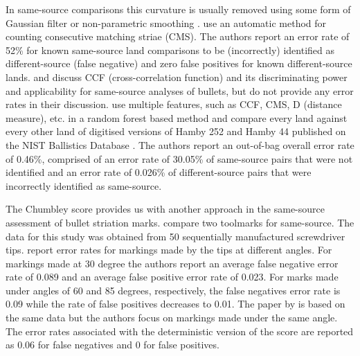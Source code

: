\documentclass[12pt]{article}
\begin{document}
In same-source comparisons this curvature is usually removed using some
form of Gaussian filter \citep{ma2004} or non-parametric smoothing
\citep{aoas}. \citet{chu2013} use an automatic method for counting
consecutive matching striae (CMS). The authors report an error rate of
52\% for known same-source land comparisons to be (incorrectly)
identified as different-source (false negative) and zero false positives
for known different-source lands. \citet{ma2004} and
\citet{vorburger2011} discuss CCF (cross-correlation function) and its
discriminating power and applicability for same-source analyses of
bullets, but do not provide any error rates in their discussion.
\citet{aoas} use multiple features, such as CCF, CMS, D (distance
measure), etc. in a random forest based method and compare every land
against every other land of digitised versions of Hamby 252 and Hamby 44
\citep{hamby} published on the NIST Ballistics Database \citep{nist}.
The authors report an out-of-bag overall error rate of 0.46\%, comprised
of an error rate of 30.05\% of same-source pairs that were not
identified and an error rate of 0.026\% of different-source pairs that
were incorrectly identified as same-source.

The Chumbley score provides us with another approach in the same-source
assessment of bullet striation marks. \citet{chumbley} compare two
toolmarks for same-source. The data for this study was obtained from 50
sequentially manufactured screwdriver tips. \citet{chumbley} report
error rates for markings made by the tips at different angles. For
markings made at 30 degree the authors report an average false negative
error rate of 0.089 and an average false positive error rate of 0.023.
For marks made under angles of 60 and 85 degrees, respectively, the
false negatives error rate is 0.09 while the rate of false positives
decreases to 0.01. The paper by \citet{hadler} is based on the same data
but the authors focus on markings made under the same angle. The error
rates associated with the deterministic version of the score are
reported as 0.06 for false negatives and 0 for false positives.
\end{document}
